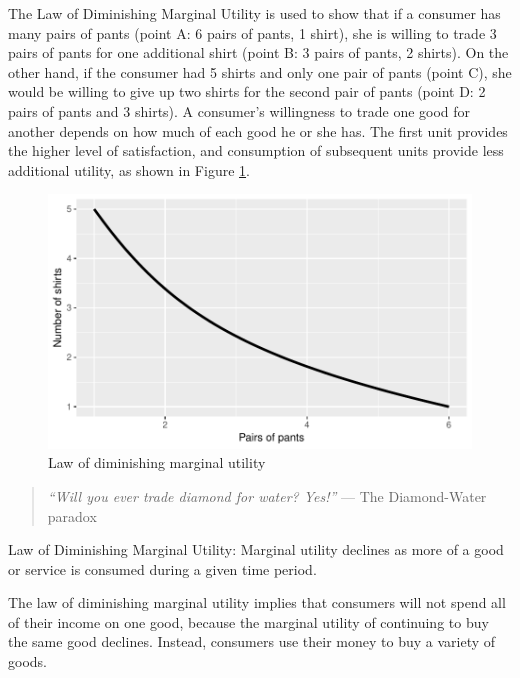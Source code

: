 \documentclass[11pt,]{book}
\theoremstyle{definition}
\theoremstyle{definition}
\theoremstyle{definition}
\theoremstyle{remark}
\begin{document}
The Law of Diminishing Marginal Utility is used to show that if a
consumer has many pairs of pants (point A: 6 pairs of pants, 1 shirt),
she is willing to trade 3 pairs of pants for one additional shirt (point
B: 3 pairs of pants, 2 shirts). On the other hand, if the consumer had 5
shirts and only one pair of pants (point C), she would be willing to
give up two shirts for the second pair of pants (point D: 2 pairs of
pants and 3 shirts). A consumer's willingness to trade one good for
another depends on how much of each good he or she has. The first unit
provides the higher level of satisfaction, and consumption of subsequent
units provide less additional utility, as shown in Figure
\ref{fig:dim-mar-utility}.

\begin{figure}

{\centering \includegraphics[width=0.9\linewidth]{Farm_Management_and_Economics_files/figure-latex/dim-mar-utility-1} 

}

\caption{Law of diminishing marginal utility}\label{fig:dim-mar-utility}
\end{figure}

\begin{quote}
\emph{``Will you ever trade diamond for water? Yes!''} --- The
Diamond-Water paradox
\end{quote}

Law of Diminishing Marginal Utility: \newline Marginal utility declines
as more of a good or service is consumed during a given time period.

The law of diminishing marginal utility implies that consumers will not
spend all of their income on one good, because the marginal utility of
continuing to buy the same good declines. Instead, consumers use their
money to buy a variety of goods.
\end{document}
